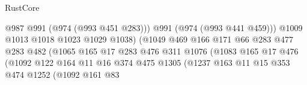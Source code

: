 \begin{lexlean}{RustCore}
\begin{coremodule}
                                                @987
                                                @991
                                                (@974 (@993 @451 @283)))
                                              @991
                                              (@974 (@993 @441 @459)))
                                            @1009
                                            @1013
                                            @1018
                                            @1023
                                            @1029
                                            @1038)
                                          (@1049
                                            @469
                                            @166
                                            @171
                                            @66
                                            @283
                                            @477
                                            @283
                                            @482
                                            (@1065
                                              @165
                                              @17
                                              @283
                                              @476
                                              @311
                                              @1076
                                              (@1083
                                                @165
                                                @17
                                                @476
                                                (@1092
                                                  @122
                                                  @164
                                                  @11
                                                  @16
                                                  @374
                                                  @475
                                                  @1305
                                                  (@1237
                                                    @163
                                                    @11
                                                    @15
                                                    @353
                                                    @474
                                                    @1252
                                                    (@1092
                                                      @161
                                                      @83

\end{coremodule}
\end{lexlean}
